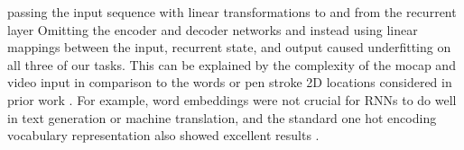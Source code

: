 \documentclass[10pt,twocolumn,letterpaper]{article}
\begin{document}
passing the input  sequence with linear transformations to and from the recurrent layer  %
Omitting the encoder and decoder networks and instead using linear mappings between the input, recurrent state, and output 
caused underfitting on all three of our tasks. 
This can be explained by the complexity of the mocap and video input in comparison to the words or pen stroke 2D  locations considered in prior work \cite{DBLP:journals/corr/Graves13}. For example, word embeddings were not crucial for RNNs to do well in text generation or machine translation, and the standard one hot encoding vocabulary representation also showed excellent results \cite{DBLP:conf/nips/SutskeverVL14}.
\end{document}
